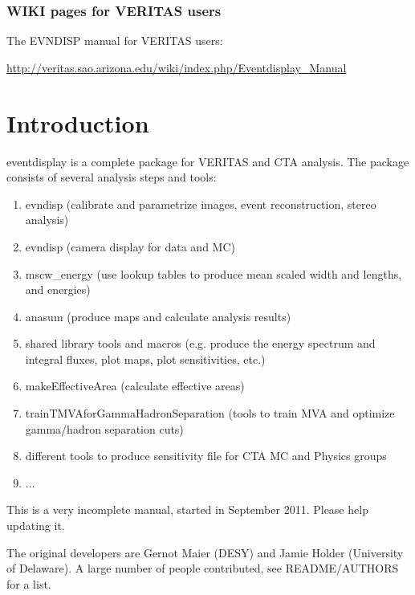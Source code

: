 \documentclass[titlepage,a4paper,twoside,11pt]{report}
\newcommand{\clearemptydoublepage}{\newpage{\pagestyle{empty}\cleardoublepage}}
\begin{document}
\subsection*{WIKI pages for VERITAS users}

The EVNDISP manual for VERITAS users: 

\url{http://veritas.sao.arizona.edu/wiki/index.php/Eventdisplay\_Manual}

\clearemptydoublepage

\chapter{Introduction}

\noindent eventdisplay is a complete package for VERITAS and CTA analysis.
The package consists of several analysis steps and tools:

\begin{enumerate}
\item evndisp (calibrate and parametrize images, event reconstruction, stereo analysis)
\item evndisp (camera display for data and MC)
\item mscw\_energy (use lookup tables to produce mean scaled width and lengths, and energies)
\item anasum (produce maps and calculate analysis results)
\item shared library tools and macros  (e.g. produce the energy spectrum and integral fluxes, plot maps, plot sensitivities, etc.) 
\item makeEffectiveArea (calculate effective areas)
\item trainTMVAforGammaHadronSeparation (tools to train MVA and optimize gamma/hadron separation cuts)
\item different tools to produce sensitivity file for CTA MC and Physics groups
\item ...
\end{enumerate}

This is a very incomplete manual, started in September 2011. Please help updating it.

The original developers are Gernot Maier (DESY) and Jamie Holder (University of Delaware). 
A large number of people contributed, see README/AUTHORS for a list.

%
%
\end{document}

